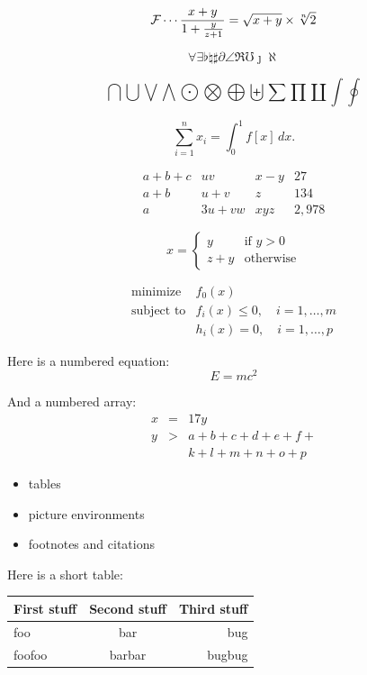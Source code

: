 \documentclass[lecture]{foils}
\begin{document}
\[
{\cal F}\cdots\frac{x+y}{1+\frac{y}{z+1}}
  = \sqrt{x+y}\times \sqrt[n]{2}
\]

\[
\forall\exists\flat\natural\sharp\partial\angle\Re\mho\jmath\aleph
\]

\[
\bigcap\bigcup\bigvee\bigwedge\bigodot\bigotimes\bigoplus\biguplus
\sum\prod\coprod\int\oint
\]

\[
\sum_{i=1}^n x_i = \int_0^1 f[x]\,dx.
\]

\[
\begin{array}{clcr}
a+b+c & uv    & x-y & 27 \\
a+b   & u+v   & z   & 134 \\
a     & 3u+vw & xyz & 2,978
\end{array}
\]

\[
x=\left\{ \begin{array}{ll}
             y   & \mbox{if $y>0$} \\
             z+y & \mbox{otherwise}
          \end{array}
   \right.
\]

\[
\begin{array}{ll}
  \mbox{minimize} & f_0(x)\\
  \mbox{subject to} & f_i(x) \leq 0, \quad i=1,\ldots,m\\
                    & h_i(x) = 0, \quad i=1,\ldots,p
\end{array}
\]

Here is a numbered equation:
\begin{equation}
  E=mc^2
\end{equation}

And a numbered array:
\begin{eqnarray}
 x & = & 17y \\
 y & > & a+b+c+d+e+f+\nonumber \\
   &   & k+l+m+n+o+p
\end{eqnarray}

\vf
\begin{itemize}\itemsep=20pt
  \item tables
  \item picture environments
  \item footnotes and citations
\end{itemize}
\vf

Here is a short table:

\begin{center}
\begin{tabular}{|l|c|r|} \hline
First stuff & Second stuff & Third stuff \\ \hline\hline
foo & bar & bug \\ \hline
foofoo & barbar & bugbug \\ \hline
\end{tabular}
\end{center}
\end{document}
